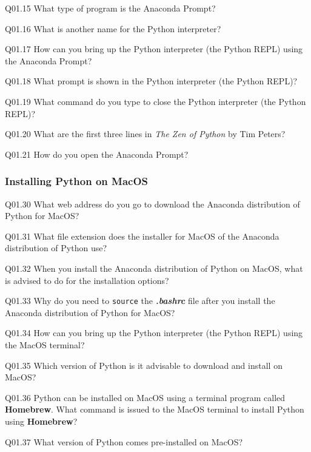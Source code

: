\documentclass{book}
\newenvironment{problems}{}{}  %
\begin{document}
\begin{problems}
Q01.15 What type of program is the Anaconda Prompt?

Q01.16 What is another name for the Python interpreter?

Q01.17 How can you bring up the Python interpreter (the Python REPL)
using the Anaconda Prompt?

Q01.18 What prompt is shown in the Python interpreter (the Python REPL)?

Q01.19 What command do you type to close the Python interpreter (the
Python REPL)?

Q01.20 What are the first three lines in \emph{The Zen of Python} by Tim
Peters?

Q01.21 How do you open the Anaconda Prompt?
        \end{problems}

    




    
        \subsubsection{Installing Python on
MacOS}\label{installing-python-on-macos}
    




    
        \begin{problems}
        Q01.30 What web address do you go to download the Anaconda distribution
of Python for MacOS?

Q01.31 What file extension does the installer for MacOS of the Anaconda
distribution of Python use?

Q01.32 When you install the Anaconda distribution of Python on MacOS,
what is advised to do for the installation options?

Q01.33 Why do you need to \lstinline!source! the \textbf{\emph{.bashrc}}
file after you install the Anaconda distribution of Python for MacOS?

Q01.34 How can you bring up the Python interpreter (the Python REPL)
using the MacOS terminal?

Q01.35 Which version of Python is it advisable to download and install
on MacOS?

Q01.36 Python can be installed on MacOS using a terminal program called
\textbf{Homebrew}. What command is issued to the MacOS terminal to
install Python using \textbf{Homebrew}?

Q01.37 What version of Python comes pre-installed on MacOS?
        \end{problems}
\end{document}
